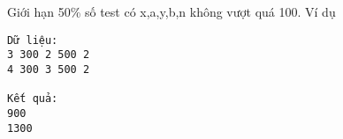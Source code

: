 Giới hạn  
50\% số test có x,a,y,b,n không vượt quá 100.
   Ví dụ  
\begin{verbatim}
Dữ liệu:
3 300 2 500 2
4 300 3 500 2

Kết quả:
900
1300

\end{verbatim}